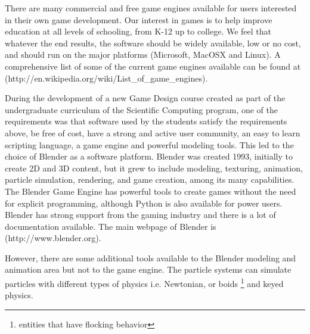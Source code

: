


There are many commercial and free game engines available for users interested in their own game development. Our interest in games is to help improve education at all levels of schooling, from K-12 up to college. We feel that whatever the end results, the software should be widely available, low or no cost, and should run on the major platforms (Microsoft, MacOSX and Linux). A comprehensive list of some of the current game engines available can be found at (http://en.wikipedia.org/wiki/List\_of\_game\_engines).  




During the development of a new Game Design course created as part of the undergraduate curriculum of the Scientific Computing program, one of the requirements was that software used by the students satisfy the requirements above, be free of cost, have a strong and active user community, an easy to learn scripting language, a game engine and powerful modeling tools. This led to the choice of Blender as a software platform. Blender was created 1993, initially to create 2D and 3D content, but it grew to include modeling, texturing, animation, particle simulation, rendering, and game creation, among its many capabilities. The Blender Game Engine has powerful tools to create games without the need for explicit programming, although Python is also available for power users. Blender has strong support from the gaming industry and there is a lot of documentation available. The main webpage of Blender is (http://www.blender.org).  


However, there are some additional tools available to the Blender modeling and animation  area but not to the game engine. The particle systems can simulate particles with different types of physics i.e. Newtonian, or boids \footnote{entities that have flocking behavior} and keyed physics. 

